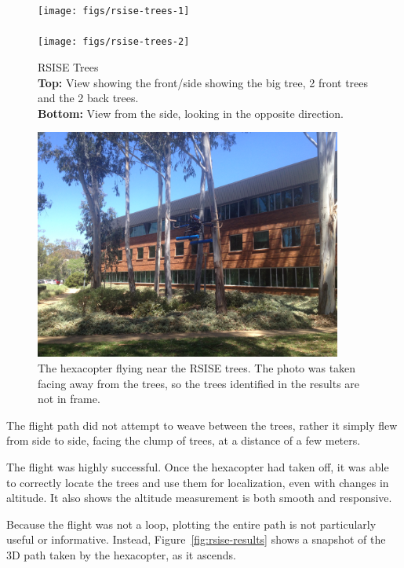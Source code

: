 \documentclass[12pt,oneside,a4paper]{book}
\begin{document}
\begin{figure}
  \centering
  \texttt{[image: figs/rsise-trees-1]}\\
  ~\\
  \texttt{[image: figs/rsise-trees-2]}
  \caption{RSISE Trees\\\textbf{Top:} View showing the front/side
    showing the big tree, 2 front trees
    and the 2 back trees.\\\textbf{Bottom:} View from the side, looking
  in the opposite direction.}
  \label{fig:rsise-trees}
\end{figure}

\begin{figure}
  \centering
  \includegraphics[width=0.9\textwidth]{figs/rsise-flying}
  \caption{The hexacopter flying near the RSISE trees. The photo was
    taken facing away from the trees, so the trees identified in the
    results are not in frame.}
  \label{fig:rsise-flying}
\end{figure}

The flight path did not attempt to weave between the trees, rather it
simply flew from side to side, facing the clump of trees, at a
distance of a few meters.

The flight was highly successful. Once the hexacopter had taken off,
it was able to correctly locate the trees and use them for
localization, even with changes in altitude. It also shows the
altitude measurement is both smooth and responsive.

Because the flight was not a loop, plotting the entire path is not
particularly useful or informative. Instead,
Figure~\ref{fig:rsise-results} shows a snapshot of the 3D path taken by
the hexacopter, as it ascends.
\end{document}
